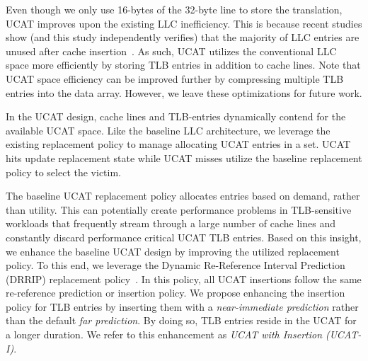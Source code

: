 Even though we only use 16-bytes of the 32-byte line to store the
translation, UCAT improves upon the existing LLC inefficiency. This is
because recent studies show (and this study independently verifies)
that the majority of LLC entries are unused after cache
insertion~\cite{jaleel_rrip,setdueling,wu2011,jimenez_micro2013,khan2010}.
As such, UCAT utilizes the conventional LLC space more efficiently by
storing TLB entries in addition to cache lines. Note that UCAT space
efficiency can be improved further by compressing multiple TLB entries
into the data array. However, we leave these optimizations for future
work.

In the UCAT design, cache lines and TLB-entries dynamically contend for
the available UCAT space. Like the baseline LLC architecture, we
leverage the existing replacement policy to manage allocating UCAT
entries in a set. UCAT hits update replacement state while UCAT misses
utilize the baseline replacement policy to select the victim.

The baseline UCAT replacement policy allocates entries based on
demand, rather than utility. This can potentially create performance
problems in TLB-sensitive workloads that frequently stream through a
large number of cache lines and constantly discard performance critical
UCAT TLB entries. Based on this insight, we enhance the baseline UCAT
design by improving the utilized replacement policy. To this end, we
leverage the Dynamic Re-Reference Interval Prediction (DRRIP)
replacement policy~\cite{jaleel_rrip}. In this policy, all UCAT
insertions follow the same re-reference prediction or insertion
policy. We propose enhancing the insertion policy for TLB entries by
inserting them with a {\em near-immediate prediction} rather than the
default {\em far prediction}. By doing so, TLB entries reside in the
UCAT for a longer duration. We refer to this enhancement as {\em UCAT
with Insertion (UCAT-I)}.

% 
% 


